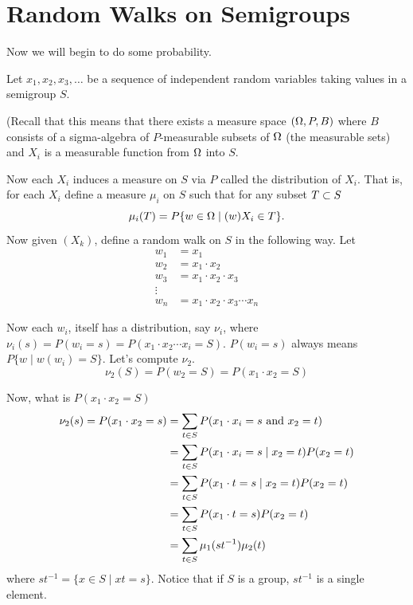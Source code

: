 


\section{Random Walks on Semigroups}
\label{sec:3.1}


Now we will begin to do some probability.

Let $x_1,x_2,x_3,\ldots$ be a sequence of independent random variables taking values in a semigroup $S$.

(Recall that this means that there exists a measure space $(\Omega,P,B)$ where $B$ consists of a sigma-algebra of $P$-measurable subsets of $\Omega$ (the measurable sets) and $X_i$ is a measurable function from $\Omega$ into $S$.

Now each $X_i$ induces a measure on $S$ via $P$ called the distribution of $X_i$.  That is, for each $X_i$ define a measure $\mu_i$ on $S$ such that for any subset $T \subset S$ 
\[
     \mu_i(T) = P\{ w \in \Omega \mid (w) X_i \in T \}.
\]
Now given $(X_k)$, define a random walk on $S$ in the following way.
Let
\[
\begin{aligned}
       w_1 &= x_1                                  \\
       w_2 &= x_1 \cdot x_2                        \\
       w_3 &= x_1 \cdot x_2 \cdot x_3              \\
        \vdots\ \ &                                 \\
       w_n &= x_1 \cdot x_2 \cdot x_3 \cdots x_n
\end{aligned}
\]

Now each $w_i$, itself has a distribution, say $\nu_i$, where $\nu_i(s) = P(w_i = s) = P(x_1 \cdot x_2 \cdots x_i = S)$.
$P(w_i = s)$ always means $P\{ w \mid w(w_i) = S \}$.  
Let's compute $\nu_2$.
\[
     \nu_2(S) = P(w_2 = S) = P(x_1 \cdot x_2 = S)
\]

Now, what is $P(x_1 \cdot x_2 = S)$
\[
\begin{aligned}
       \nu_2(s) = P(x_1 \cdot x_2 = s)
               &= \sum_{t\in S} P(x_1 \cdot x_i = s \hbox{ and }
                    x_2 = t)                       \\
          &= \sum_{t\in S} P(x_1 \cdot x_i = s \mid x_2 = t)
                    P(x_2 = t)                     \\
          &= \sum_{t\in S} P(x_1 \cdot t = s \mid x_2 = t)
                    P(x_2 = t)                     \\
          &= \sum_{t\in S} P(x_1 \cdot t = s) P(x_2 = t)       \\
          &= \sum_{t\in S} \mu_1(st^{-1}) \mu_2(t)
\end{aligned}
\]
where $st^{-1} = \{ x \in S \mid xt = s \}$.  
Notice that if $S$ is a group, $st^{-1}$ is a single element.

